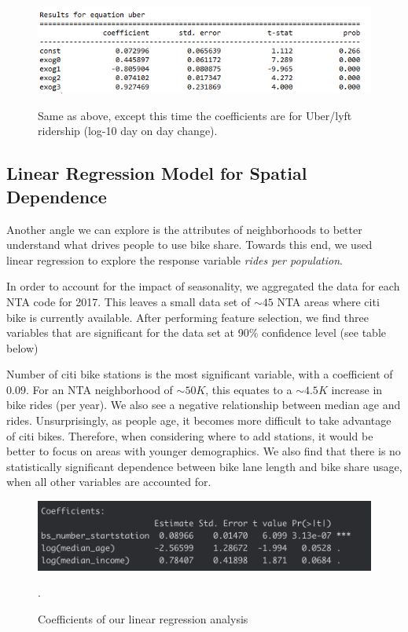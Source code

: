 \documentclass[12pt]{article}
\begin{document}
\begin{figure}[htbp]
    \includegraphics[scale=0.8]{exog_uber.PNG}
    \label{fig:weather_coef_uber}
    \caption{Same as above, except this time the coefficients are for Uber/lyft ridership (log-10 day on day change).}
\end{figure}



\newpage

\subsection*{Linear Regression Model for Spatial Dependence}
Another angle we can explore is the attributes of neighborhoods to better understand what drives people to use bike share. Towards this end, we used linear regression to explore the response variable \textit{rides per population}.
\par In order to account for the impact of seasonality, we aggregated the data for each NTA code for 2017. This leaves a small data set of $\sim45$ NTA areas where citi bike is currently available. After performing feature selection, we find three variables that are significant for the data set at 90\% confidence level (see table below)
\par Number of citi bike stations is the most significant variable, with a coefficient of $0.09$. For an NTA neighborhood of $\sim 50K$, this equates to a $\sim 4.5K$ increase in bike rides (per year). We also see a negative relationship between median age and rides. Unsurprisingly, as people age, it becomes more difficult to take advantage of citi bikes. Therefore, when considering where to add stations, it would be better to focus on areas with younger demographics. We also find that there is no statistically significant dependence between bike lane length and bike share usage, when all other variables are accounted for.
\begin{figure}[htbp]
    \includegraphics[scale=0.8]{wx.PNG}
    \label{fig:exog}
    \caption{Coefficients of our linear regression analysis}.
\end{figure}
\end{document}
